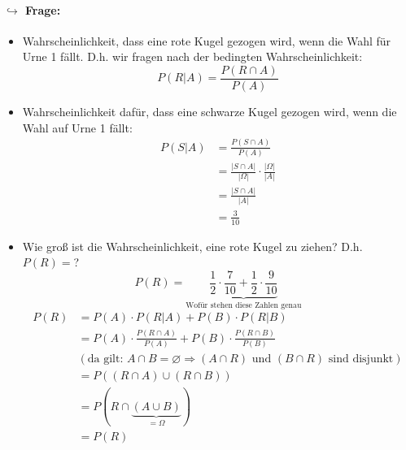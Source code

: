 \documentclass[12pt,a4paper]{article}
\begin{document}
 	\paragraph{$\hookrightarrow$ Frage:}
 	\begin{itemize}
 	\item Wahrscheinlichkeit, dass eine rote Kugel gezogen wird, wenn die Wahl für Urne 1 fällt. D.h. wir fragen nach der bedingten Wahrscheinlichkeit:
 	$$P(R|A)=\frac{P(R\cap A)}{P(A)}$$
 	\item Wahrscheinlichkeit dafür, dass eine schwarze Kugel gezogen wird, wenn die Wahl auf Urne 1 fällt:
 	\begin{equation*}
 	\begin{split}
 	P(S|A) & =\frac{P(S\cap A)}{P(A)}\\
 	& = \frac{|S\cap A|}{|\Omega|}\cdot\frac{|\Omega|}{|A|}\\
 	& = \frac{|S\cap A|}{|A|}\\
 	& =\frac{3}{10}
 	\end{split}
 	\end{equation*}
 	\item Wie groß ist die Wahrscheinlichkeit, eine rote Kugel zu ziehen? D.h. $P(R)=$?
 	$$P(R)=\underbrace{\frac{1}{2}\cdot\frac{7}{10}+\frac{1}{2}\cdot\frac{9}{10}}_{\text{Wofür stehen diese Zahlen genau}}$$
 	\begin{equation*}
 	\begin{split}
	P(R) & =P(A)\cdot P(R|A) + P(B)\cdot P(R|B)\\
	& =P(A)\cdot\frac{P(R\cap A)}{P(A)}+P(B)\cdot\frac{P(R\cap B)}{P(B)}\\
	& (\text{da gilt: } A\cap B = \varnothing \Rightarrow (A\cap R) \text { und } (B\cap R) \text{ sind disjunkt})\\
	& =P\left(\left(R\cap A\right) \cup \left(R\cap B\right)\right)\\
	& =P\left(R\cap\underbrace{(A\cup B)}_{=\Omega}\right)\\
	& =P(R)	
 	\end{split}
 	\end{equation*}
 	\end{itemize}
 	
\end{document}
